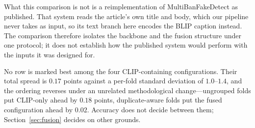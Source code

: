 \documentclass[pdflatex,sn-mathphys-num]{sn-jnl}
\begin{document}
What this comparison is not is a reimplementation of MultiBanFakeDetect as
published. That system reads the article's own title and body, which our
pipeline never takes as input, so its text branch here encodes the BLIP caption
instead. The comparison therefore isolates the backbone and the fusion
structure under one protocol; it does not establish how the published system
would perform with the inputs it was designed for.

No row is marked best among the four CLIP-containing configurations. Their
total spread is $0.17$ points against a per-fold standard deviation of
$1.0$--$1.4$, and the ordering reverses under an unrelated methodological
change---ungrouped folds put CLIP-only ahead by $0.18$ points, duplicate-aware
folds put the fused configuration ahead by $0.02$. Accuracy does not decide
between them; Section~\ref{sec:fusion} decides on other grounds.
\end{document}
